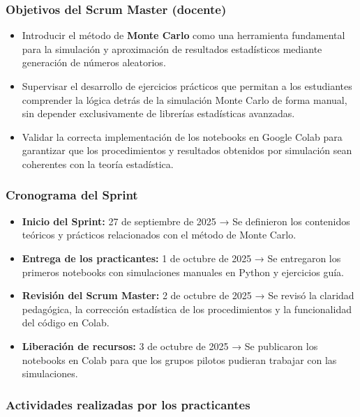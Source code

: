 \documentclass[letter,oneside,12pt,spanish]{report}
\begin{document}
\subsubsection*{Objetivos del Scrum Master (docente)}
\begin{itemize}
	\item Introducir el método de \textbf{Monte Carlo} como una herramienta fundamental para la simulación y aproximación de resultados estadísticos mediante generación de números aleatorios.
	\item Supervisar el desarrollo de ejercicios prácticos que permitan a los estudiantes comprender la lógica detrás de la simulación Monte Carlo de forma manual, sin depender exclusivamente de librerías estadísticas avanzadas.
	\item Validar la correcta implementación de los notebooks en Google Colab para garantizar que los procedimientos y resultados obtenidos por simulación sean coherentes con la teoría estadística.
\end{itemize}

\subsubsection*{Cronograma del Sprint}
\begin{itemize}
	\item \textbf{Inicio del Sprint:} 27 de septiembre de 2025 → Se definieron los contenidos teóricos y prácticos relacionados con el método de Monte Carlo.
	\item \textbf{Entrega de los practicantes:} 1 de octubre de 2025 → Se entregaron los primeros notebooks con simulaciones manuales en Python y ejercicios guía.
	\item \textbf{Revisión del Scrum Master:} 2 de octubre de 2025 → Se revisó la claridad pedagógica, la corrección estadística de los procedimientos y la funcionalidad del código en Colab.
	\item \textbf{Liberación de recursos:} 3 de octubre de 2025 → Se publicaron los notebooks en Colab para que los grupos pilotos pudieran trabajar con las simulaciones.
\end{itemize}

\subsubsection*{Actividades realizadas por los practicantes}
\end{document}
